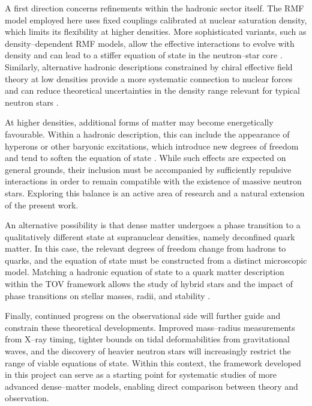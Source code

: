 A first direction concerns refinements within the hadronic sector itself. The
RMF model employed here uses fixed couplings calibrated at nuclear saturation
density, which limits its flexibility at higher densities. More sophisticated
variants, such as density--dependent RMF models, allow the effective
interactions to evolve with density and can lead to a stiffer equation of state
in the neutron--star core \cite{glendenning2000}. Similarly, alternative
hadronic descriptions constrained by chiral effective field theory at low
densities provide a more systematic connection to nuclear forces and can reduce
theoretical uncertainties in the density range relevant for typical neutron
stars \cite{Hebeler2015Review}.

At higher densities, additional forms of matter may become energetically
favourable. Within a hadronic description, this can include the appearance of
hyperons or other baryonic excitations, which introduce new degrees of freedom
and tend to soften the equation of state \cite{glendenning2000}. While such
effects are expected on general grounds, their inclusion must be accompanied by
sufficiently repulsive interactions in order to remain compatible with the
existence of massive neutron stars. Exploring this balance is an active area of
research and a natural extension of the present work.

An alternative possibility is that dense matter undergoes a phase transition
to a qualitatively different state at supranuclear densities, namely deconfined
quark matter. In this case, the relevant degrees of freedom change from hadrons
to quarks, and the equation of state must be constructed from a distinct
microscopic model. Matching a hadronic equation of state to a quark matter
description within the TOV framework allows the study of hybrid stars and the
impact of phase transitions on stellar masses, radii, and stability
\cite{glendenning2000,Alford2008}.

Finally, continued progress on the observational side will further guide and
constrain these theoretical developments. Improved mass--radius measurements
from X--ray timing, tighter bounds on tidal deformabilities from gravitational
waves, and the discovery of heavier neutron stars will increasingly restrict
the range of viable equations of state. Within this context, the framework
developed in this project can serve as a starting point for systematic studies
of more advanced dense--matter models, enabling direct comparison between
theory and observation.
